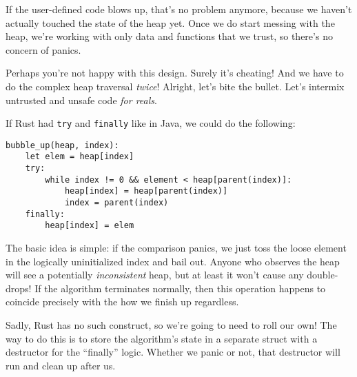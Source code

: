 \documentclass[a4paper,]{book}
\begin{document}
If the user-defined code blows up, that's no problem anymore, because we
haven't actually touched the state of the heap yet. Once we do start
messing with the heap, we're working with only data and functions that
we trust, so there's no concern of panics.

Perhaps you're not happy with this design. Surely it's cheating! And we
have to do the complex heap traversal \emph{twice}! Alright, let's bite
the bullet. Let's intermix untrusted and unsafe code \emph{for reals}.

If Rust had \texttt{try} and \texttt{finally} like in Java, we could do
the following:

\begin{verbatim}
bubble_up(heap, index):
    let elem = heap[index]
    try:
        while index != 0 && element < heap[parent(index)]:
            heap[index] = heap[parent(index)]
            index = parent(index)
    finally:
        heap[index] = elem
\end{verbatim}

The basic idea is simple: if the comparison panics, we just toss the
loose element in the logically uninitialized index and bail out. Anyone
who observes the heap will see a potentially \emph{inconsistent} heap,
but at least it won't cause any double-drops! If the algorithm
terminates normally, then this operation happens to coincide precisely
with the how we finish up regardless.

Sadly, Rust has no such construct, so we're going to need to roll our
own! The way to do this is to store the algorithm's state in a separate
struct with a destructor for the ``finally'' logic. Whether we panic or
not, that destructor will run and clean up after us.
\end{document}

